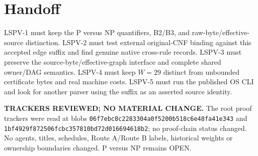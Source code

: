 \documentclass[11pt]{article}
\begin{document}
\section*{Handoff}
LSPV-1 must keep the P versus NP quantifiers, B2/B3, and raw-byte/effective-source distinction. LSPV-2 must test external original-CNF binding against this accepted edge suffix and find genuine native cross-rule records. LSPV-3 must preserve the source-byte/effective-graph interface and complete shared owner/DAG semantics. LSPV-4 must keep $W=29$ distinct from unbounded certificate bytes and real machine costs. LSPV-5 must run the published OS CLI and look for another parser using the suffix as an asserted source identity.

\noindent\textbf{TRACKERS REVIEWED; NO MATERIAL CHANGE.} The root proof trackers were read at blobs \texttt{06f7ebc8c2283304a0f5200b518c6e48fa41e343} and \texttt{1bf4929f872506fcbc357810bd72d016694618b2}; no proof-chain status changed. No agents, titles, schedules, Route A/Route B labels, historical weights or ownership boundaries changed. P versus NP remains OPEN.
\end{document}
